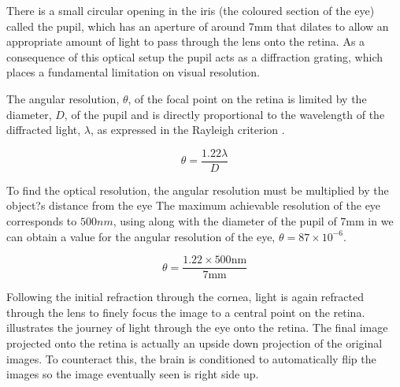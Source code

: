 There is a small circular opening in the iris (the coloured section of
the eye) called the pupil, which has an aperture of around 7mm that
dilates to allow an appropriate amount of light to pass through
the lens onto the retina.\cite{krugman1964some} As a consequence of
this optical setup the pupil acts as a diffraction grating, which places a 
fundamental limitation on visual resolution. 

The angular resolution, $\theta$, of the focal point on the retina is limited by
the diameter, $D$, of the pupil and is directly proportional to the wavelength
of the diffracted light, $\lambda$, as expressed in the Rayleigh criterion
 .\cite{rayleigh1907dynamical}

\begin{equation}
\theta=\frac{1.22\lambda}{D}
\label{eq:res_limit}
\end{equation}

To find the optical resolution, the angular resolution must be multiplied by the
object?s distance from the eye The maximum achievable resolution of the eye
corresponds  to $500nm$, using  along with the diameter of
the pupil of 7mm in  we can obtain a value for the angular
resolution of the eye, $\theta=87\times 10^{-6}$.

\begin{equation}
\theta=\frac{1.22\times 500\textrm{nm}}{7\textrm{mm}}
\label{eq:eye_res}
\end{equation}

Following the initial refraction through the cornea, light is again refracted
through the lens to finely focus the image to a central point on the retina.
 illustrates the journey of light through the eye
onto the retina. The final image projected onto the retina is actually an
upside down projection of the original images. To counteract this, the
brain is conditioned to automatically flip the images so the image eventually
seen is right side up.

